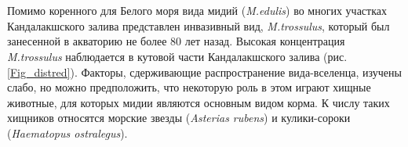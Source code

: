 \documentclass[20pt,a0,portrait]{a0poster}
\begin{document}
\begin{minipage}[t]{0.5\linewidth}		
		
% 			
% 			
% 		




		\color{Black} %



\section*{}




		
%
\begin{minipage}[t][10cm][t]{0.4\textwidth}

Помимо коренного для Белого моря вида мидий (\emph{M.edulis}) во многих участках  Кандалакшского залива представлен инвазивный вид, \emph{M.trossulus}, который был занесенной в акваторию не более 80 лет назад. Высокая концентрация \emph{M.trossulus} наблюдается в кутовой части Кандалакшского залива (рис. \ref {Fig_distred}). Факторы, сдерживающие распространение  вида-вселенца, изучены слабо, но можно предположить, что некоторую роль в этом играют хищные животные, для которых мидии являются основным видом корма. К числу таких хищников относятся морские звезды (\emph{Asterias rubens}) и кулики-сороки (\emph{Haematopus  ostralegus}). 


\end{minipage}
\end{minipage}
\end{document}
